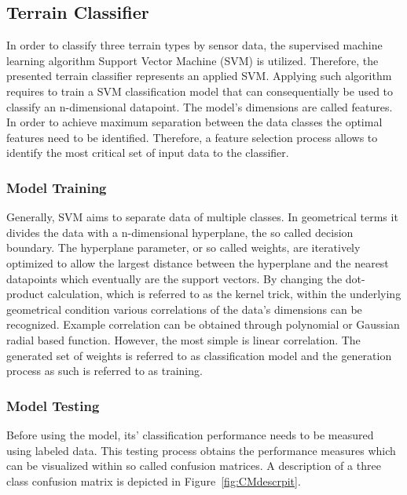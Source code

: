 \documentclass{article}
\begin{document}
\subsection{Terrain Classifier}

In order to classify three terrain types by sensor data, the supervised machine learning algorithm Support Vector Machine (SVM) is utilized. Therefore, the presented terrain classifier represents an applied SVM. Applying such algorithm requires to train a SVM classification model that can consequentially be used to classify an n-dimensional datapoint.
The model's dimensions are called features. In order to achieve maximum separation between the data classes the optimal features need to be identified. Therefore, a feature selection process allows to identify the most critical set of input data to the classifier. 

\subsubsection{Model Training}
Generally, SVM aims to separate data of multiple classes. In geometrical terms it divides the data with a n-dimensional hyperplane, the so called decision boundary. The hyperplane parameter, or so called weights, are iteratively optimized to allow the largest distance between the hyperplane and the nearest datapoints which eventually are the support vectors.  
By changing the dot-product calculation, which is referred to as the kernel trick, within the underlying geometrical condition various correlations of the data's dimensions can be recognized. Example correlation can be obtained through polynomial or Gaussian radial based function. However, the most simple is linear correlation.
The generated set of weights is referred to as classification model and the generation process as such is referred to as training.\cite{kuhr2021}



\subsubsection{Model Testing}
Before using the model, its' classification performance needs to be measured using labeled data. This testing process obtains the performance measures which can be visualized within so called confusion matrices. A description of a three class confusion matrix is depicted in Figure~\ref{fig:CMdescrpit}.\cite{kuhr2021}
\end{document}
